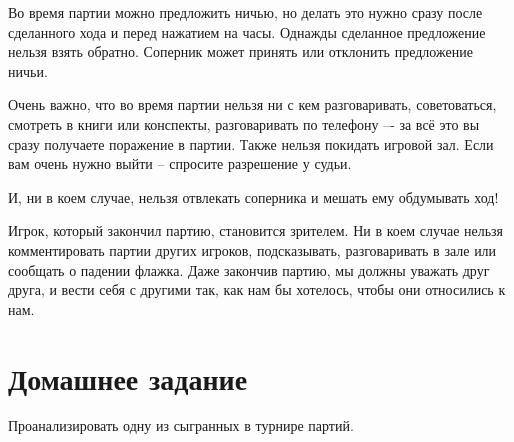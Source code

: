Во время партии можно предложить ничью, но делать это нужно сразу после сделанного хода и перед нажатием на часы. Однажды сделанное предложение нельзя взять обратно. Соперник может принять или отклонить предложение ничьи.

Очень важно, что во время партии нельзя ни с кем разговаривать, советоваться, смотреть в книги или конспекты, разговаривать по телефону –- за всё это вы сразу получаете поражение в партии. Также нельзя покидать игровой зал. Если вам очень нужно выйти – спросите разрешение у судьи.

И, ни в коем случае, нельзя отвлекать соперника и мешать ему обдумывать ход!

Игрок, который закончил партию, становится зрителем. Ни в коем случае нельзя комментировать партии других игроков, подсказывать, разговаривать в зале или сообщать о падении флажка. Даже закончив партию, мы должны уважать друг друга, и вести себя с другими так, как нам бы хотелось, чтобы они относились к нам.

\section{Домашнее задание}

Проанализировать одну из сыгранных в турнире партий.